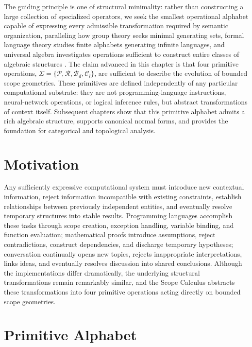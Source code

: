 \documentclass[11pt,twoside,openright]{book}
\numberwithin{equation}{chapter}
\theoremstyle{definition}
\theoremstyle{plain}
\theoremstyle{remark}
\theoremstyle{definition}
\newcommand{\Alphabet}{\Sigma}
\newcommand{\Pop}{\mathcal{P}}
\newcommand{\Refuse}{\mathcal{R}}
\newcommand{\Bind}{\mathcal{B}_d}
\newcommand{\Collapse}{\mathcal{C}_l}
\newcommand{\ScopeAlphabet}{\Alphabet=\{\Pop,\Refuse,\Bind,\Collapse\}}
\begin{document}
The guiding principle is one of structural minimality: rather than
constructing a large collection of specialized operators, we seek the
smallest operational alphabet capable of expressing every admissible
transformation required by semantic organization, paralleling how group
theory seeks minimal generating sets, formal language theory studies
finite alphabets generating infinite languages, and universal algebra
investigates operations sufficient to construct entire classes of
algebraic structures \cite{MacLane1998,Hopcroft2006,Burris1981}. The claim
advanced in this chapter is that four primitive operations,
$\ScopeAlphabet$, are sufficient to describe the evolution of bounded
scope geometries. These primitives are defined independently of any
particular computational substrate: they are not programming-language
instructions, neural-network operations, or logical inference rules, but
abstract transformations of context itself. Subsequent chapters show that
this primitive alphabet admits a rich algebraic structure, supports
canonical normal forms, and provides the foundation for categorical and
topological analysis.

\section{Motivation}

Any sufficiently expressive computational system must introduce new
contextual information, reject information incompatible with existing
constraints, establish relationships between previously independent
entities, and eventually resolve temporary structures into stable
results. Programming languages accomplish these tasks through scope
creation, exception handling, variable binding, and function evaluation;
mathematical proofs introduce assumptions, reject contradictions,
construct dependencies, and discharge temporary hypotheses; conversation
continually opens new topics, rejects inappropriate interpretations,
links ideas, and eventually resolves discussion into shared conclusions.
Although the implementations differ dramatically, the underlying
structural transformations remain remarkably similar, and the Scope
Calculus abstracts these transformations into four primitive operations
acting directly on bounded scope geometries.

\section{Primitive Alphabet}
\end{document}
